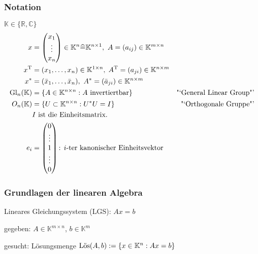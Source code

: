 \subsubsection{Notation}
$\mathbb{K} \in \{\mathbb{R}, \mathbb{C}\}$ \\
\begin{align*}
x &= \begin{pmatrix} x_1 \\ \vdots \\ x_n \end{pmatrix}
\in \mathbb{K}^n \widehat{=} \mathbb{K}^{n \times 1},
~ A=(a_{ij}) \in \mathbb{K}^{m \times n}  \\
x^\mathrm T &= (x_1, \dots, x_n) \in \mathbb{K}^{1 \times n},\;
A^\mathrm T = (a_{ji}) \in \mathbb{K}^{n \times m}  \\
x^{\ast} &= (\bar{x}_1, \dots, \bar{x}_n),
~A^{\ast} = (\bar{a}_{ji}) \in \mathbb{K}^{n \times m}  \\
\mathrm{Gl}_n(\mathbb K) &= \{A \in \mathbb{K}^{n \times n}: A
\text{ invertiertbar} \} & \text{"`General Linear Group"'}  \\
O_n (\mathbb{K})&= \{ U \subset \mathbb{K}^{n \times n}:
U^{\ast} U = I \} & \text{"`Orthogonale Gruppe"'} \\
& I \text{ ist die Einheitsmatrix.} \\
e_i &= \begin{pmatrix} 0 \\ \vdots \\ 1 \\ \vdots \\ 0 \end{pmatrix}
\text{:  $i$-ter kanonischer Einheitsvektor } \\
\end{align*}

\subsubsection{Grundlagen der linearen Algebra}

Lineares Gleichungssystem (LGS): $Ax=b$

gegeben: $A \in \mathbb{K}^{m \times n}$, $b \in \mathbb{K}^m$

gesucht: Lösungsmenge $\mathrm{L\ddot{o}s}(A,b) := \{x \in \mathbb{K}^n : Ax=b\} $

